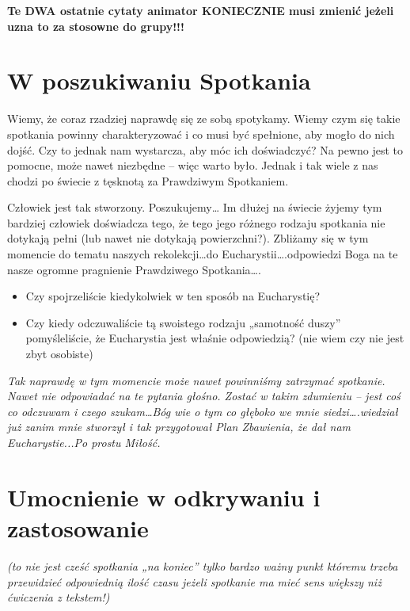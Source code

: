 \documentclass[a5paper,10pt,polish]{book}
\begin{document}
\textbf{Te DWA ostatnie cytaty animator KONIECZNIE musi zmienić jeżeli uzna to za stosowne do grupy!!!}


\section{W poszukiwaniu Spotkania}
\label{babice2006-jesien-knurow/spotkanie1:w-poszukiwaniu-spotkania}
Wiemy, że coraz rzadziej naprawdę się ze sobą spotykamy. Wiemy czym się takie spotkania powinny charakteryzować i co musi być spełnione, aby mogło do nich dojść. Czy to jednak nam wystarcza, aby móc ich doświadczyć? Na pewno jest to pomocne, może nawet niezbędne – więc warto było. Jednak i tak wiele z nas chodzi po świecie z tęsknotą za Prawdziwym Spotkaniem.

Człowiek jest tak stworzony. Poszukujemy… Im dłużej na świecie żyjemy tym bardziej człowiek doświadcza tego, że tego jego różnego rodzaju spotkania nie dotykają pełni (lub nawet nie dotykają powierzchni?). Zbliżamy się w tym momencie do tematu naszych rekolekcji…do Eucharystii….odpowiedzi Boga na te nasze ogromne pragnienie Prawdziwego Spotkania….
\begin{itemize}
\item {} 
Czy spojrzeliście kiedykolwiek w ten sposób na Eucharystię?

\item {} 
Czy kiedy odczuwaliście tą swoistego rodzaju „samotność duszy” pomyśleliście, że Eucharystia jest właśnie odpowiedzią? (nie wiem czy nie jest zbyt osobiste)

\end{itemize}

\emph{Tak naprawdę w tym momencie może nawet powinniśmy zatrzymać spotkanie. Nawet nie odpowiadać na te pytania głośno. Zostać w takim zdumieniu – jest coś co odczuwam
i czego szukam…Bóg wie o tym co głęboko we mnie siedzi….wiedział już zanim mnie stworzył i tak przygotował Plan Zbawienia, że dał nam Eucharystie...Po prostu Miłość.}


\section{Umocnienie w odkrywaniu i zastosowanie}
\label{babice2006-jesien-knurow/spotkanie1:umocnienie-w-odkrywaniu-i-zastosowanie}
\emph{(to nie jest cześć spotkania „na koniec” tylko bardzo ważny punkt któremu trzeba przewidzieć odpowiednią ilość czasu jeżeli spotkanie ma mieć sens większy niż ćwiczenia z tekstem!)}
\end{document}

